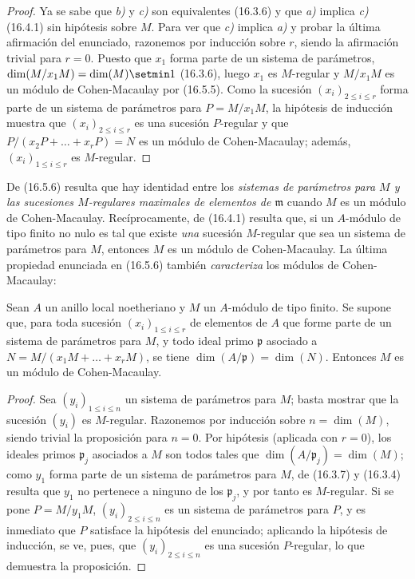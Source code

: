 \begin{proof}
Ya se sabe que \emph{b)} y \emph{c)} son equivalentes (16.3.6) y que \emph{a)} implica \emph{c)}
(16.4.1) sin hipótesis sobre $M$. Para ver que \emph{c)} implica \emph{a)} y probar la
última afirmación del enunciado, razonemos por inducción sobre $r$, siendo la
afirmación trivial para $r=0$. Puesto que $x_1$ forma parte de un sistema de
parámetros, $\dim(M/x_1M)=\dim(M)\setmin 1$ (16.3.6), luego $x_1$ es $M$-regular y
$M/x_1M$ es un módulo de Cohen-Macaulay por (16.5.5). Como la sucesión
$(x_i)_{2\leq i\leq r}$ forma parte de un sistema de parámetros para
$P=M/x_1M$, la hipótesis de inducción muestra que $(x_i)_{2\leq i\leq r}$ es
una sucesión $P$-regular y que
$P/(x_2P+\ldots+x_rP)=N$ es un módulo de Cohen-Macaulay; además,
$(x_i)_{1\leq i\leq r}$ es $M$-regular.
\end{proof}

\begin{remark}[16.5.7]
\label{0.16.5.7-fr}
De (16.5.6) resulta que hay identidad entre los \emph{sistemas de
parámetros para $M$ y las sucesiones $M$-regulares maximales de elementos de
$\mathfrak{m}$} cuando $M$ es un módulo de Cohen-Macaulay. Recíprocamente, de
(16.4.1) resulta que, si un $A$-módulo de tipo finito no nulo es tal que existe
\emph{una} sucesión $M$-regular que sea un sistema de parámetros para $M$, entonces
$M$ es un módulo de Cohen-Macaulay. La última propiedad enunciada en
(16.5.6) también \emph{caracteriza} los módulos de Cohen-Macaulay:
\end{remark}

\begin{proposition}[16.5.8]
\label{0.16.5.8-fr}
Sean $A$ un anillo local noetheriano y $M$ un $A$-módulo de tipo finito. Se
supone que, para toda sucesión $(x_i)_{1\leq i\leq r}$ de elementos de $A$
que forme parte de un sistema de parámetros para $M$, y todo ideal primo
$\mathfrak{p}$ asociado a
$N=M/(x_1M+\ldots+x_rM)$, se tiene
$\dim(A/\mathfrak{p})=\dim(N)$. Entonces $M$ es un módulo de Cohen-Macaulay.
\end{proposition}

\begin{proof}
Sea $(y_i)_{1\leq i\leq n}$ un sistema de parámetros para $M$; basta
mostrar que la sucesión $(y_i)$ es $M$-regular. Razonemos por inducción sobre
$n=\dim(M)$, siendo trivial la proposición para $n=0$. Por hipótesis
(aplicada con $r=0$), los ideales primos $\mathfrak{p}_j$ asociados a $M$
son todos tales que $\dim(A/\mathfrak{p}_j)=\dim(M)$; como $y_1$ forma parte
de un sistema de parámetros
para $M$, de (16.3.7) y (16.3.4) resulta que $y_1$ no pertenece a ninguno
de los $\mathfrak{p}_j$, y por tanto es $M$-regular. Si se pone $P=M/y_1M$,
$(y_i)_{2\leq i\leq n}$ es un sistema de parámetros para $P$, y es
inmediato que $P$ satisface la hipótesis del enunciado; aplicando la hipótesis
de inducción, se ve, pues, que $(y_i)_{2\leq i\leq n}$ es una sucesión
$P$-regular, lo que demuestra la proposición.
\end{proof}

